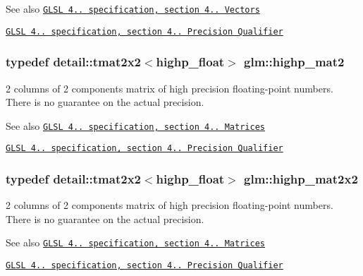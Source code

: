 \begin{DoxySeeAlso}{See also}
\href{http://www.opengl.org/registry/doc/GLSLangSpec.4.20.8.pdf}{\tt G\+L\+S\+L 4.. specification, section 4.. Vectors} 

\href{http://www.opengl.org/registry/doc/GLSLangSpec.4.20.8.pdf}{\tt G\+L\+S\+L 4.. specification, section 4.. Precision Qualifier} 
\end{DoxySeeAlso}
\hypertarget{group__core__precision_ga6652bb577f74f322220305a985a8c200}{}
\subsubsection[{highp\+\_\+mat2}]{\setlength{\rightskip}{0pt plus 5cm}typedef detail\+::tmat2x2$<$highp\+\_\+float$>$ {\bf glm\+::highp\+\_\+mat2}}\label{group__core__precision_ga6652bb577f74f322220305a985a8c200}
2 columns of 2 components matrix of high precision floating-\/point numbers. There is no guarantee on the actual precision.

\begin{DoxySeeAlso}{See also}
\href{http://www.opengl.org/registry/doc/GLSLangSpec.4.20.8.pdf}{\tt G\+L\+S\+L 4.. specification, section 4.. Matrices} 

\href{http://www.opengl.org/registry/doc/GLSLangSpec.4.20.8.pdf}{\tt G\+L\+S\+L 4.. specification, section 4.. Precision Qualifier} 
\end{DoxySeeAlso}
\hypertarget{group__core__precision_gadc6208de252d8c5d4afd1a3518370db3}{}
\subsubsection[{highp\+\_\+mat2x2}]{\setlength{\rightskip}{0pt plus 5cm}typedef detail\+::tmat2x2$<$highp\+\_\+float$>$ {\bf glm\+::highp\+\_\+mat2x2}}\label{group__core__precision_gadc6208de252d8c5d4afd1a3518370db3}
2 columns of 2 components matrix of high precision floating-\/point numbers. There is no guarantee on the actual precision.

\begin{DoxySeeAlso}{See also}
\href{http://www.opengl.org/registry/doc/GLSLangSpec.4.20.8.pdf}{\tt G\+L\+S\+L 4.. specification, section 4.. Matrices} 

\href{http://www.opengl.org/registry/doc/GLSLangSpec.4.20.8.pdf}{\tt G\+L\+S\+L 4.. specification, section 4.. Precision Qualifier} 
\end{DoxySeeAlso}
\hypertarget{group__core__precision_ga89136b699656886b0941c95cf2778da3}{}
